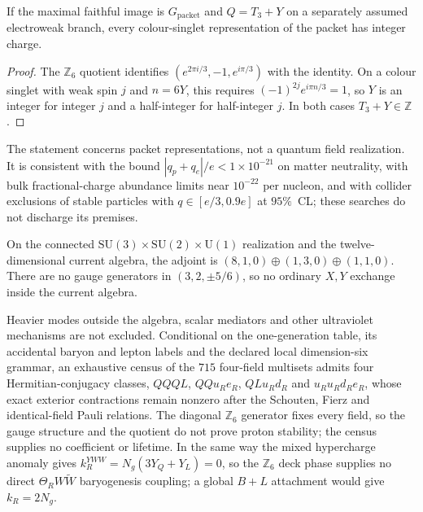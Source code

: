 \documentclass[11pt]{article}
\begin{document}
\begin{theorem}
If the maximal faithful image is \(G_{\mathrm{packet}}\) and \(Q=T_3+Y\) on a
separately assumed electroweak branch, every colour-singlet representation
of the packet has integer charge.
\end{theorem}

\begin{proof}
The \(\mathbb Z_6\) quotient identifies
\((e^{2\pi i/3},-1,e^{i\pi/3})\) with the identity. On a colour singlet with
weak spin \(j\) and \(n=6Y\), this requires \((-1)^{2j}e^{i\pi n/3}=1\), so
\(Y\) is an integer for integer \(j\) and a half-integer for half-integer
\(j\). In both cases \(T_3+Y\in\mathbb Z\).
\end{proof}

The statement concerns packet representations, not a quantum field
realization. It is consistent with the bound \(|q_p+q_e|/e<1\times10^{-21}\)
on matter neutrality, with bulk fractional-charge abundance limits near
\(10^{-22}\) per nucleon, and with collider exclusions of stable particles
with \(q\in[e/3,0.9e]\) at \(95\%\)~CL; these
searches do not discharge its premises.

\begin{corollary}
On the connected \(\mathrm{SU}(3)\times\mathrm{SU}(2)\times\mathrm U(1)\)
realization and the twelve-dimensional current algebra, the adjoint is
\((8,1,0)\oplus(1,3,0)\oplus(1,1,0)\). There are no gauge generators in
\((3,2,\pm5/6)\), so no ordinary \(X,Y\) exchange inside the current algebra.
\end{corollary}

Heavier modes outside the algebra, scalar mediators and other ultraviolet
mechanisms are not excluded. Conditional on the one-generation table, its
accidental baryon and lepton labels and the declared local dimension-six
grammar, an exhaustive census of the \(715\) four-field multisets admits four
Hermitian-conjugacy classes, \(QQQL\), \(QQu_Re_R\), \(QLu_Rd_R\) and
\(u_Ru_Rd_Re_R\), whose exact exterior contractions remain nonzero after the
Schouten, Fierz and identical-field Pauli relations. The diagonal
\(\mathbb Z_6\) generator fixes every field, so the gauge structure and the
quotient do not prove proton stability; the census supplies no coefficient
or lifetime. In the same way the mixed hypercharge anomaly gives
\(k_R^{YWW}=N_g(3Y_Q+Y_L)=0\), so the \(\mathbb Z_6\) deck phase supplies no
direct \(\Theta_RW\widetilde W\) baryogenesis coupling; a global \(B+L\)
attachment would give \(k_R=2N_g\).
\end{document}
